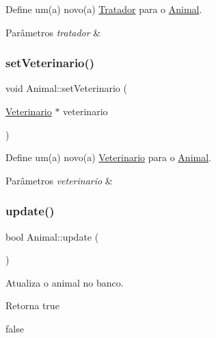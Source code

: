 Define um(a) novo(a) \hyperlink{classTratador}{Tratador} para o \hyperlink{classAnimal}{Animal}. 


\begin{DoxyParams}{Parâmetros}
{\em tratador} & \\
\hline
\end{DoxyParams}
\mbox{\label{classAnimal_ace9b58ea47057261292ce42a4edd2870}} 
\subsubsection{\texorpdfstring{set\+Veterinario()}{setVeterinario()}}
{\footnotesize\ttfamily void Animal\+::set\+Veterinario (\begin{DoxyParamCaption}\item[{\hyperlink{classVeterinario}{Veterinario} $\ast$}]{veterinario }\end{DoxyParamCaption})}



Define um(a) novo(a) \hyperlink{classVeterinario}{Veterinario} para o \hyperlink{classAnimal}{Animal}. 


\begin{DoxyParams}{Parâmetros}
{\em veterinario} & \\
\hline
\end{DoxyParams}
\mbox{\label{classAnimal_a2b9de87e4f753fc9f92aeb012bf098c5}} 
\subsubsection{\texorpdfstring{update()}{update()}}
{\footnotesize\ttfamily bool Animal\+::update (\begin{DoxyParamCaption}{ }\end{DoxyParamCaption})}



Atualiza o animal no banco. 

\begin{DoxyReturn}{Retorna}
true 

false 
\end{DoxyReturn}
\mbox{\label{classAnimal_a42e0c72ec2c9881cbf5d1be57c418cc5}} 
